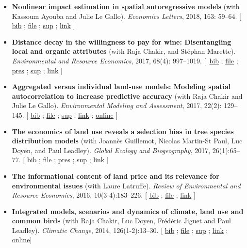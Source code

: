 \documentclass[11pt, a4paper]{./style}
\begin{document}
\begin{itemize}
\item \textbf{Nonlinear impact estimation in spatial autoregressive models}
(with Kassoum Ayouba and Julie Le Gallo). \emph{Economics Letters},
2018, 163: 59--64. [ \href{bib/NLSP.bib}{bib} ; \href{doc/NLSP-FILE.pdf}{file} ; \href{doc/NLSP-SUP.pdf}{sup} ; \href{https://www.sciencedirect.com/science/article/pii/S0165176517304846}{link} ]
\item \textbf{Distance decay in the willingness to pay for wine: Disentangling
local and organic attributes} (with Raja Chakir, and Stéphan
Marette). \emph{Environmental and Resource Economics}, 2017, 68(4):
997--1019. [~\href{bib/DWTP.bib}{bib} ; \href{doc/DWTP-FILE.pdf}{file} ; \href{doc/DWTP-PRES.pdf}{pres} ; \href{doc/DWTP-SUP.pdf}{sup} ; \href{https://link.springer.com/article/10.1007/s10640-016-0057-8}{link} ]
\item \textbf{Aggregated versus individual land-use models: Modeling spatial
autocorrelation to increase predictive accuracy} (with Raja
Chakir and Julie Le Gallo). \emph{Environmental Modeling and
Assessment}, 2017, 22(2): 129--145. [ \href{bib/LUMP.bib}{bib} ; \href{doc/LUMP-FILE.pdf}{file} ; \href{doc/LUMP-SUP.pdf}{sup} ; \href{https://link.springer.com/article/10.1007/s10666-016-9523-5}{link} ;
\href{https://github.com/jsay/spatial-pred-R}{online} ]
\item \textbf{The economics of land use reveals a selection bias in tree
species distribution models} (with Joannès Guillemot, Nicolas
Martin-St Paul, Luc Doyen, and Paul Leadley). \emph{Global Ecology and
Biogeography}, 2017, 26(1):65--77. [ \href{bib/NTSDM.bib}{bib} ; \href{doc/NTSDM-FILE.pdf}{file} ; \href{doc/NTSDM-PRES.pdf}{pres} ; \href{doc/NTSDM-SUP.pdf}{sup} ;
\href{https://onlinelibrary.wiley.com/doi/abs/10.1111/geb.12514}{link} ]
\item \textbf{The informational content of land price and its relevance for
environmental issues} (with Laure Latruffe). \emph{Review of
Environmental and Resource Economics}, 2016, 10(3-4):183--226. [
\href{bib/RLP.bib}{bib} ; \href{doc/RLP-FILE.pdf}{file} ; \href{https://www.nowpublishers.com/article/Details/IRERE-0086}{link} ]
\item \textbf{Integrated models, scenarios and dynamics of climate, land use
and common birds} (with Raja Chakir, Luc Doyen, Frédéric Jiguet
and Paul Leadley). \emph{Climatic Change}, 2014, 126(1-2):13--30. [
\href{bib/CILE.bib}{bib} ; \href{doc/CILE-FILE.pdf}{file} ; \href{doc/CILE-SUP.pdf}{sup} ; \href{https://link.springer.com/article/10.1007/s10584-014-1202-4}{link} ; \href{https://mobilis-a4ac2.firebaseapp.com/index.html}{online}]

\end{itemize}
\end{document}
